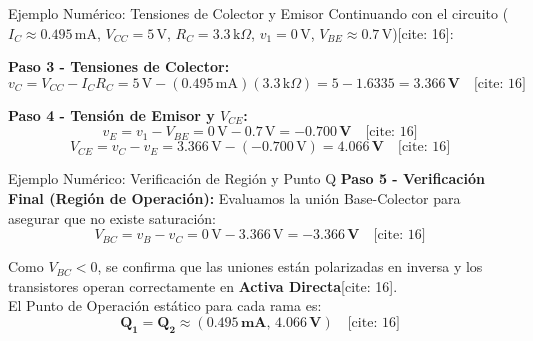 \documentclass[aspectratio=169]{beamer}
\begin{document}
\begin{frame}{Ejemplo Numérico: Tensiones de Colector y Emisor}
    Continuando con el circuito ($I_C \approx 0.495\,\text{mA}$, $V_{CC}=5\,\text{V}$, $R_C=3.3\,\text{k}\Omega$, $v_1=0\,\text{V}$, $V_{BE}\approx0.7\,\text{V}$)[cite: 16]:
    
    \vspace{0.3cm}
    \textbf{Paso 3 - Tensiones de Colector:}
    \begin{equation*}
        v_C = V_{CC} - I_C R_C = 5\,\text{V} - (0.495\,\text{mA})(3.3\,\text{k}\Omega) = 5 - 1.6335 = \mathbf{3.366\,\text{V}} \quad \text{[cite: 16]}
    \end{equation*}
    
    \vspace{0.3cm}
    \textbf{Paso 4 - Tensión de Emisor y $V_{CE}$:}
    \begin{equation*}
        v_E = v_1 - V_{BE} = 0\,\text{V} - 0.7\,\text{V} = \mathbf{-0.700\,\text{V}} \quad \text{[cite: 16]}
    \end{equation*}
    \begin{equation*}
        V_{CE} = v_C - v_E = 3.366\,\text{V} - (-0.700\,\text{V}) = \mathbf{4.066\,\text{V}} \quad \text{[cite: 16]}
    \end{equation*}
\end{frame}

\begin{frame}{Ejemplo Numérico: Verificación de Región y Punto Q}
    \textbf{Paso 5 - Verificación Final (Región de Operación):}
    Evaluamos la unión Base-Colector para asegurar que no existe saturación:
    \begin{equation*}
        V_{BC} = v_B - v_C = 0\,\text{V} - 3.366\,\text{V} = \mathbf{-3.366\,\text{V}} \quad \text{[cite: 16]}
    \end{equation*}
    
    \vspace{0.3cm}
    \begin{tcolorbox}[colback=green!5, colframe=green!50!black, title=\textbf{Conclusión Matemática}]
        Como $V_{BC} < 0$, se confirma que las uniones están polarizadas en inversa y los transistores operan correctamente en \textbf{Activa Directa}[cite: 16]. \\
        El Punto de Operación estático para cada rama es:
        \begin{equation*}
            \mathbf{Q_1 = Q_2 \approx (0.495\,\text{mA},\, 4.066\,\text{V})} \quad \text{[cite: 16]}
        \end{equation*}
    \end{tcolorbox}
\end{frame}
\end{document}
